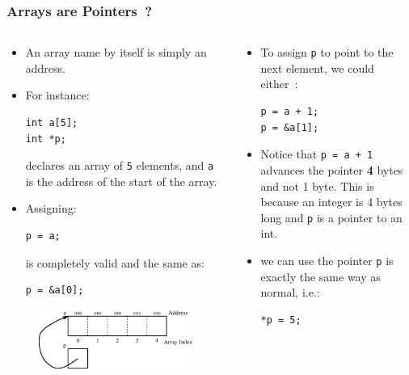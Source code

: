 

\begin{frame}[fragile]
\frametitle{Arrays are Pointers~?}
\begin{columns}[T]

\begin{column}{0.45\textwidth}
\begin{itemize}[<+->]
\item An array name by itself is simply an address.
\item 
For instance:
\begin{verbatim}
int a[5];
int *p;
\end{verbatim}
declares an array of \verb^5^ elements, and
\verb^a^ is the address of the start of the
array.
\item
Assigning:
\begin{verbatim}
p = a;
\end{verbatim}
is completely valid and
the same as:
\begin{verbatim}
p = &a[0];
\end{verbatim}
\end{itemize}
\begin{center}
\begin{figure}[ht]
\centerline{
\includegraphics[scale=0.25]{../Figs/array9_2.eps}
}
\end{figure}
\end{center}
\end{column}


\pause
\begin{column}{0.45\textwidth}
\begin{itemize}[<+->]
\item To assign \verb^p^ to point to the next element,
we could either~:
\begin{verbatim}
p = a + 1;
p = &a[1];
\end{verbatim}
\item Notice that \verb^p = a + 1^ advances
the pointer {\bf 4} bytes and not 1 byte.
This is because an integer is 4 bytes long and
\verb^p^ is a pointer to an int.
\item we can use the pointer \verb^p^ is exactly
the same way as normal, i.e.:
\begin{verbatim}
*p = 5;
\end{verbatim}
\end{itemize}
\end{column}

\end{columns}
\end{frame}


